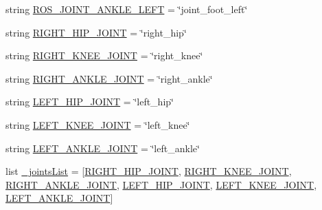 \begin{DoxyCompactItemize}
string \mbox{\hyperlink{namespacepedal__simulation__interpolation__linear__trajectory__points_a601687afe04f4c7814fee7ac4af804f6}{R\+O\+S\+\_\+\+J\+O\+I\+N\+T\+\_\+\+A\+N\+K\+L\+E\+\_\+\+L\+E\+FT}} = \char`\"{}joint\+\_\+foot\+\_\+left\char`\"{}
\item 
string \mbox{\hyperlink{namespacepedal__simulation__interpolation__linear__trajectory__points_a303b81404877d3cada1a712ccdfdcac3}{R\+I\+G\+H\+T\+\_\+\+H\+I\+P\+\_\+\+J\+O\+I\+NT}} = \char`\"{}right\+\_\+hip\char`\"{}
\item 
string \mbox{\hyperlink{namespacepedal__simulation__interpolation__linear__trajectory__points_a707545ad904721bb0f00348a2cf93f11}{R\+I\+G\+H\+T\+\_\+\+K\+N\+E\+E\+\_\+\+J\+O\+I\+NT}} = \char`\"{}right\+\_\+knee\char`\"{}
\item 
string \mbox{\hyperlink{namespacepedal__simulation__interpolation__linear__trajectory__points_a73797898e16f2468ee1e593d1ff8571d}{R\+I\+G\+H\+T\+\_\+\+A\+N\+K\+L\+E\+\_\+\+J\+O\+I\+NT}} = \char`\"{}right\+\_\+ankle\char`\"{}
\item 
string \mbox{\hyperlink{namespacepedal__simulation__interpolation__linear__trajectory__points_a2e323c236affa8da1a73fd22ec5c57fd}{L\+E\+F\+T\+\_\+\+H\+I\+P\+\_\+\+J\+O\+I\+NT}} = \char`\"{}left\+\_\+hip\char`\"{}
\item 
string \mbox{\hyperlink{namespacepedal__simulation__interpolation__linear__trajectory__points_a9c802e4a98b4578d0c641fe208f2442d}{L\+E\+F\+T\+\_\+\+K\+N\+E\+E\+\_\+\+J\+O\+I\+NT}} = \char`\"{}left\+\_\+knee\char`\"{}
\item 
string \mbox{\hyperlink{namespacepedal__simulation__interpolation__linear__trajectory__points_abdefc2b4767c73a7a8294af102dd3415}{L\+E\+F\+T\+\_\+\+A\+N\+K\+L\+E\+\_\+\+J\+O\+I\+NT}} = \char`\"{}left\+\_\+ankle\char`\"{}
\item 
list \mbox{\hyperlink{namespacepedal__simulation__interpolation__linear__trajectory__points_a49880c9dedc855e3a7261fed8e06e9b9}{\+\_\+joints\+List}} = \mbox{[}\mbox{\hyperlink{namespacepedal__simulation__interpolation__linear__trajectory__points_a303b81404877d3cada1a712ccdfdcac3}{R\+I\+G\+H\+T\+\_\+\+H\+I\+P\+\_\+\+J\+O\+I\+NT}}, \mbox{\hyperlink{namespacepedal__simulation__interpolation__linear__trajectory__points_a707545ad904721bb0f00348a2cf93f11}{R\+I\+G\+H\+T\+\_\+\+K\+N\+E\+E\+\_\+\+J\+O\+I\+NT}}, \mbox{\hyperlink{namespacepedal__simulation__interpolation__linear__trajectory__points_a73797898e16f2468ee1e593d1ff8571d}{R\+I\+G\+H\+T\+\_\+\+A\+N\+K\+L\+E\+\_\+\+J\+O\+I\+NT}}, \mbox{\hyperlink{namespacepedal__simulation__interpolation__linear__trajectory__points_a2e323c236affa8da1a73fd22ec5c57fd}{L\+E\+F\+T\+\_\+\+H\+I\+P\+\_\+\+J\+O\+I\+NT}}, \mbox{\hyperlink{namespacepedal__simulation__interpolation__linear__trajectory__points_a9c802e4a98b4578d0c641fe208f2442d}{L\+E\+F\+T\+\_\+\+K\+N\+E\+E\+\_\+\+J\+O\+I\+NT}}, \mbox{\hyperlink{namespacepedal__simulation__interpolation__linear__trajectory__points_abdefc2b4767c73a7a8294af102dd3415}{L\+E\+F\+T\+\_\+\+A\+N\+K\+L\+E\+\_\+\+J\+O\+I\+NT}}\mbox{]}

\end{DoxyCompactItemize}
